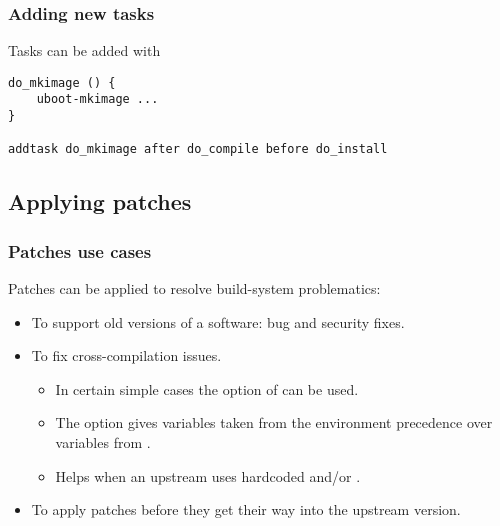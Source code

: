 \begin{frame}[fragile]
  \frametitle{Adding new tasks}
  Tasks can be added with 
  \begin{block}{}
    \begin{verbatim}
do_mkimage () {
    uboot-mkimage ...
}

addtask do_mkimage after do_compile before do_install
    \end{verbatim}
  \end{block}
\end{frame}

\subsection{Applying patches}

\begin{frame}
  \frametitle{Patches use cases}
  Patches can be applied to resolve build-system problematics:
  \begin{itemize}
    \item To support old versions of a software: bug and security
      fixes.
    \item To fix cross-compilation issues.
      \begin{itemize}
        \item In certain simple cases the  option of
           can be used.
        \item The  option gives variables taken from the
          environment precedence over variables from .
        \item Helps when an upstream  uses hardcoded
           and/or .
      \end{itemize}
    \item To apply patches before they get their way into the upstream
      version.
  \end{itemize}
\end{frame}

